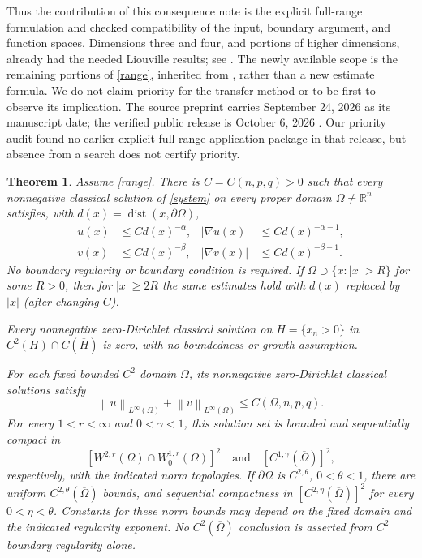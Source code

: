 \documentclass[11pt]{article}
\newcommand{\R}{\mathbb R}
\newcommand{\dist}{\operatorname{dist}}
\newcommand{\norm}[1]{\left\lVert#1\right\rVert}
\newtheorem{theorem}{Theorem}
\begin{document}
Thus the contribution of this consequence note is the explicit full-range
formulation and checked compatibility of the input, boundary argument,
and function spaces. Dimensions three and four, and portions of higher
dimensions, already had the needed Liouville results; see
\cite{PQS,Souplet,LiLiWei}. The newly available scope is the remaining
portions of \eqref{range}, inherited from \cite{OAI}, rather than a
new estimate formula. We do not claim priority for the transfer method
or to be first to observe its implication. The source preprint carries
September 24, 2026 as its manuscript date; the verified public release
is October 6, 2026 \cite{release}. Our priority audit found no earlier
explicit full-range application package in that release, but absence
from a search does not certify priority.

\begin{theorem}\label{main}
Assume \eqref{range}. There is $C=C(n,p,q)>0$ such that every
nonnegative classical solution of \eqref{system} on every proper
domain $\Omega\ne\R^n$ satisfies, with $d(x)=\dist(x,\partial\Omega)$,
\begin{equation}\label{distance}
 \begin{aligned}
 u(x)&\le C d(x)^{-\alpha},&
 |\nabla u(x)|&\le C d(x)^{-\alpha-1},\\
 v(x)&\le C d(x)^{-\beta},&
 |\nabla v(x)|&\le C d(x)^{-\beta-1}.
 \end{aligned}
\end{equation}
No boundary regularity or boundary condition is required.
If $\Omega\supset\{x:|x|>R\}$ for some $R>0$, then for
$|x|\ge2R$ the same estimates hold with $d(x)$ replaced by $|x|$
(after changing $C$).

Every nonnegative zero-Dirichlet classical solution on
$H=\{x_n>0\}$ in $C^2(H)\cap C(\overline H)$ is zero, with no
boundedness or growth assumption.

For each fixed bounded $C^2$ domain $\Omega$, its nonnegative
zero-Dirichlet classical solutions satisfy
\begin{equation}\label{dirichlet}
 \norm{u}_{L^\infty(\Omega)}+\norm{v}_{L^\infty(\Omega)}
 \le C(\Omega,n,p,q).
\end{equation}
For every $1<r<\infty$ and $0<\gamma<1$, this solution set is bounded
and sequentially compact in
\[
 [W^{2,r}(\Omega)\cap W^{1,r}_0(\Omega)]^2
 \quad\text{and}\quad [C^{1,\gamma}(\overline\Omega)]^2,
\]
respectively, with the indicated norm topologies.
If $\partial\Omega$ is $C^{2,\theta}$, $0<\theta<1$, there are uniform
$C^{2,\theta}(\overline\Omega)$ bounds, and sequential compactness
in $[C^{2,\eta}(\overline\Omega)]^2$ for every $0<\eta<\theta$.
Constants for these norm bounds may depend on the fixed domain and the
indicated regularity exponent. No $C^2(\overline\Omega)$ conclusion is
asserted from $C^2$ boundary regularity alone.
\end{theorem}
\end{document}
